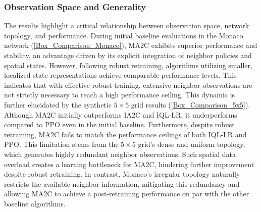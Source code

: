 \documentclass[lettersize,journal]{IEEEtran}
\begin{document}

\subsubsection{Observation Space and Generality}
The results highlight a critical relationship between observation space, network topology, and performance. During initial baseline evaluations in the Monaco network (\cref{Box_Comparison_Monaco}), MA2C exhibits superior performance and stability, an advantage driven by its explicit integration of neighbor policies and spatial states. However, following robust retraining, algorithms utilizing smaller, localized state representations achieve comparable performance levels. This indicates that with effective robust training, extensive neighbor observations are not strictly necessary to reach a high performance ceiling. This dynamic is further elucidated by the synthetic $5\times 5$ grid results (\cref{Box_Comparison_5x5}). Although MA2C initially outperforms IA2C and IQL-LR, it underperforms compared to PPO even in the initial baseline. Furthermore, despite robust retraining, MA2C fails to match the performance ceilings of both IQL-LR and PPO. This limitation stems from the $5\times 5$ grid's dense and uniform topology, which generates highly redundant neighbor observations. Such spatial data overload creates a learning bottleneck for MA2C, hindering further improvement despite robust retraining. In contrast, Monaco's irregular topology naturally restricts the available neighbor information, mitigating this redundancy and allowing MA2C to achieve a post-retraining performance on par with the other baseline algorithms.
\end{document}
